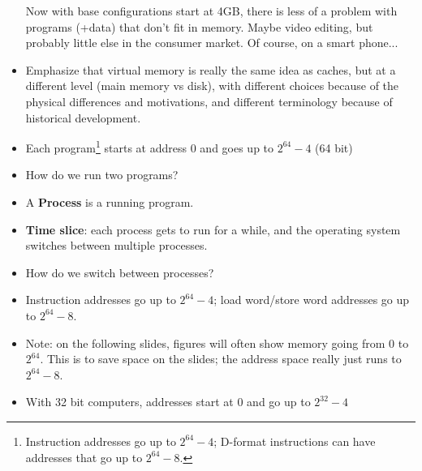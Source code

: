 \begin{frame}[fragile]
\begin{itemize}
Now with base configurations start at 4GB, there is less of a problem
with programs (+data) that don't fit in memory.  Maybe video editing, but
probably little else in the consumer market.  Of course, on a smart phone...

\item Emphasize that virtual memory is really the same idea as caches,
but at a different level (main memory vs disk), with different choices
because of the physical differences and motivations,
and different terminology because of historical development. 
\end{itemize}
\fi\ENotes
\end{frame}

\begin{frame}[fragile]

\begin{itemize}
\item Each program\footnote{Instruction addresses go up to $2^{64}-4$; D-format instructions can have addresses that go up to $2^{64}-8$.} starts at address 0 and goes up to $2^{64}-4$ (64 bit)

\item How do we run two programs?
\item A \textbf{Process }is a running program. 

\item \textbf{Time slice}: each process gets to run for a while, and the operating system switches between multiple processes.

\item How do we switch between processes?

\end{itemize}
\BNotes\ifnum{}
\begin{itemize}
	\item Instruction addresses go up to $2^{64}-4$; load word/store word
		addresses go up to $2^{64}-8$.
	\item Note: on the following slides, figures will often show
		memory going from 0 to $2^{64}$.  This is to save space
		on the slides; the address space really just runs to $2^{64}-8$.
	\item With 32 bit computers, addresses start at 0 and go up to $2^{32}-4$
\end{itemize}
\fi\ENotes
\end{frame}






